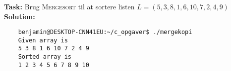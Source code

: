 \subsubsection{}
\textbf{Task:} Brug \textsc{Mergesort} til at sortere listen $L=(5,3,8,1,6,10,7,2,4,9)$
\bigskip
\noindent
\textbf{Solution:}

\begin{lstlisting}
    benjamin@DESKTOP-CNN41EU:~/c_opgaver$ ./mergekopi
    Given array is
    5 3 8 1 6 10 7 2 4 9
    Sorted array is
    1 2 3 4 5 6 7 8 9 10
\end{lstlisting}


